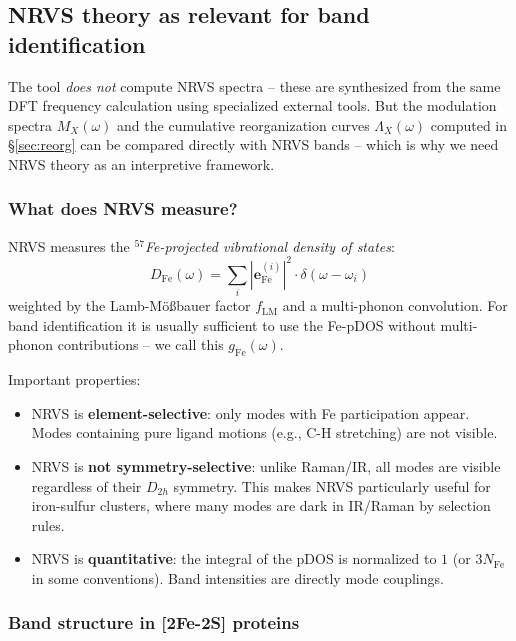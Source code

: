 \documentclass[11pt,a4paper,twoside]{article}
\theoremstyle{remark}
\begin{document}
\subsection{NRVS theory as relevant for band identification}
\label{sec:nrvs}

The tool \emph{does not} compute NRVS spectra -- these are
synthesized from the same DFT frequency calculation using
specialized external tools. But the modulation spectra
$M_X(\omega)$ and the cumulative reorganization curves
$\Lambda_X(\omega)$ computed in \S\ref{sec:reorg} can be compared
directly with NRVS bands -- which is why we need NRVS theory as an
interpretive framework.

\subsubsection*{What does NRVS measure?}

NRVS \cite{Sturhahn2004} measures the
\emph{$^{57}$Fe-projected vibrational density of states}:
\begin{equation}
  D_\text{Fe}(\omega) = \sum_i |\mathbf{e}_\text{Fe}^{(i)}|^2 \cdot
                          \delta(\omega - \omega_i)
  \label{eq:fe-pdos}
\end{equation}
weighted by the Lamb-M\"o{\ss}bauer factor $f_\text{LM}$ and a
multi-phonon convolution. For band identification it is usually
sufficient to use the Fe-pDOS without multi-phonon contributions
-- we call this $g_\text{Fe}(\omega)$.

Important properties:
\begin{itemize}\setlength{\itemsep}{0pt}
  \item NRVS is \textbf{element-selective}: only modes with Fe
        participation appear. Modes containing pure ligand motions
        (e.g., C-H stretching) are not visible.
  \item NRVS is \textbf{not symmetry-selective}: unlike Raman/IR,
        all modes are visible regardless of their $D_{2h}$
        symmetry. This makes NRVS particularly useful for
        iron-sulfur clusters, where many modes are dark in
        IR/Raman by selection rules.
  \item NRVS is \textbf{quantitative}: the integral of the pDOS is
        normalized to $1$ (or $3 N_\text{Fe}$ in some
        conventions). Band intensities are directly mode
        couplings.
\end{itemize}

\subsubsection*{Band structure in [2Fe-2S] proteins}
\end{document}
